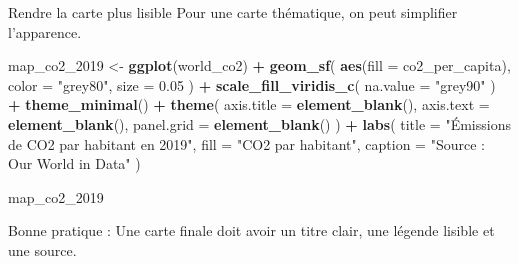\documentclass[
  10pt,
  ignorenonframetext,
]{beamer}
\newenvironment{Shaded}{\begin{snugshade}}{\end{snugshade}}
\newcommand{\AttributeTok}[1]{\textcolor[rgb]{0.13,0.29,0.53}{#1}}
\newcommand{\FloatTok}[1]{\textcolor[rgb]{0.00,0.00,0.81}{#1}}
\newcommand{\FunctionTok}[1]{\textcolor[rgb]{0.13,0.29,0.53}{\textbf{#1}}}
\newcommand{\NormalTok}[1]{#1}
\newcommand{\OtherTok}[1]{\textcolor[rgb]{0.56,0.35,0.01}{#1}}
\newcommand{\SpecialCharTok}[1]{\textcolor[rgb]{0.81,0.36,0.00}{\textbf{#1}}}
\newcommand{\StringTok}[1]{\textcolor[rgb]{0.31,0.60,0.02}{#1}}
\begin{document}
\begin{frame}[fragile]{Rendre la carte plus lisible}
\label{rendre-la-carte-plus-lisible}
Pour une carte thématique, on peut simplifier l'apparence.

\begin{Shaded}
\begin{Highlighting}[]
\NormalTok{map\_co2\_2019 }\OtherTok{\textless{}{-}} \FunctionTok{ggplot}\NormalTok{(world\_co2) }\SpecialCharTok{+}
  \FunctionTok{geom\_sf}\NormalTok{(}
    \FunctionTok{aes}\NormalTok{(}\AttributeTok{fill =}\NormalTok{ co2\_per\_capita),}
    \AttributeTok{color =} \StringTok{"grey80"}\NormalTok{,}
    \AttributeTok{size =} \FloatTok{0.05}
\NormalTok{  ) }\SpecialCharTok{+}
  \FunctionTok{scale\_fill\_viridis\_c}\NormalTok{(}
    \AttributeTok{na.value =} \StringTok{"grey90"}
\NormalTok{  ) }\SpecialCharTok{+}
  \FunctionTok{theme\_minimal}\NormalTok{() }\SpecialCharTok{+}
  \FunctionTok{theme}\NormalTok{(}
    \AttributeTok{axis.title =} \FunctionTok{element\_blank}\NormalTok{(),}
    \AttributeTok{axis.text =} \FunctionTok{element\_blank}\NormalTok{(),}
    \AttributeTok{panel.grid =} \FunctionTok{element\_blank}\NormalTok{()}
\NormalTok{  ) }\SpecialCharTok{+}
  \FunctionTok{labs}\NormalTok{(}
    \AttributeTok{title =} \StringTok{"Émissions de CO2 par habitant en 2019"}\NormalTok{,}
    \AttributeTok{fill =} \StringTok{"CO2 par habitant"}\NormalTok{,}
    \AttributeTok{caption =} \StringTok{"Source : Our World in Data"}
\NormalTok{  )}

\NormalTok{map\_co2\_2019}
\end{Highlighting}
\end{Shaded}

Bonne pratique : Une carte finale doit avoir un titre clair, une légende
lisible et une source.
\end{frame}
\end{document}
